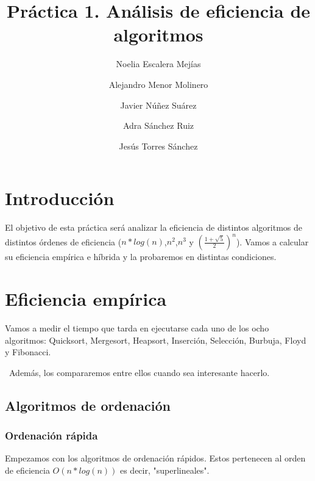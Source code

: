 \documentclass{article}
\title{Práctica 1. Análisis de eficiencia de algoritmos}
\author{Noelia Escalera Mejías \\
		\and Alejandro Menor Molinero \\
		\and Javier Núñez Suárez \\
		\and Adra Sánchez Ruiz \\
		\and Jesús Torres Sánchez}
\begin{document}
	\maketitle
	\tableofcontents
	\section{Introducción}
	El objetivo de esta práctica será analizar la eficiencia de distintos algoritmos de distintos órdenes de eficiencia ($n*log(n)$,$n^2$,$n^3$ y $(\frac{1+\sqrt{5}}{2})^n$). Vamos a calcular su eficiencia empírica e híbrida y la probaremos en distintas condiciones.
	\section{Eficiencia empírica}
	Vamos a medir el tiempo que tarda en ejecutarse cada uno de los ocho algoritmos: Quicksort, Mergesort, Heapsort, Inserción, Selección, Burbuja, Floyd y Fibonacci.
	
	\
	Además, los compararemos entre ellos cuando sea interesante hacerlo.
	\subsection{Algoritmos de ordenación}
	\subsubsection{Ordenación rápida}
	Empezamos con los algoritmos de ordenación rápidos. Estos pertenecen al orden de eficiencia $O(n*log(n))$ es decir, "superlineales".
	
\end{document}
